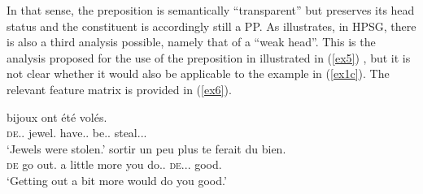 \documentclass[output=paper]{langsci/langscibook}
\begin{document}
\begin{exe}
\ex\label{ex4}
\end{exe}

In that sense, the preposition is semantically \enquote{transparent} but
preserves its head status and the constituent is accordingly still a PP. As
 illustrates, in \gls{HPSG}, there is also a third
analysis possible, namely that of a \enquote{weak head}. This is the analysis
proposed for the use of the preposition in  illustrated in (\ref{ex5})
\citep[150]{Abeilleetal06}, but it is not clear whether it would also be
applicable to the  example in (\ref{ex1c}). The relevant feature matrix
is provided in (\ref{ex6}).

\begin{exe}
\ex\label{ex5} 
\begin{xlist}
\ex\label{ex5a}
 bijoux ont \'et\'e vol\'es.\\
    \textsc{de}.\Def.\Pl{} jewel.\Pl{} have.\Prs.\Tpl{} be.\Pst.\Ptcp{} steal.\Pst.\Ptcp.\Pl{}\\
\trans \enquote*{Jewels were stolen.}
\ex\label{ex5b}
 sortir un peu plus te ferait  du bien.\\
	\textsc{de} {go out.\Inf{}} a little more you do.\Cond.\Tsg{}
    \textsc{de}.\Def.\M.\Sg{} good.\Sg{}	\\
\trans \enquote*{Getting out a bit more would do you good.}
\end{xlist}
\end{exe}

\begin{exe}
\ex\label{ex6}
\end{exe}
\end{document}
